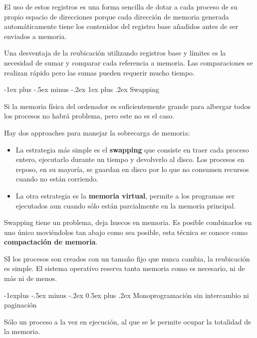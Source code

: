 \documentclass[10pt,portrait, twocolumn]{article}
\makeatletter
\renewcommand{\subsection}{\@startsection{subsection}{2}{0mm}%
                                {-1explus -.5ex minus -.2ex}%
                                {0.5ex plus .2ex}%
                                {\normalfont\normalsize\bfseries}}
\renewcommand{\subsubsection}{\@startsection{subsubsection}{3}{0mm}%
                                {-1ex plus -.5ex minus -.2ex}%
                                {1ex plus .2ex}%
                                {\normalfont\small\bfseries}}
\makeatother
\begin{document}
El uso de estos registros es una forma sencilla de dotar a cada proceso de su propio espacio de direcciones porque cada dirección de memoria generada automáticamente tiene los contenidos del registro base añadidos antes de ser enviados a memoria.

	\quad Una desventaja de la reubicación utilizando registros base y límites es la necesidad de sumar y comparar cada referencia a memoria. Las comparaciones se realizan rápido pero las sumas pueden requerir mucho tiempo.
	
\subsubsection{Swapping}

Si la memoria física del ordenador es suficientemente grande para albergar todos los procesos no habrá problema, pero este no es el caso. 

	\quad Hay dos approaches para manejar la sobrecarga de memoria:
	
	\begin{itemize}
		\item La estrategia más simple es el \textbf{swapping} que consiste en traer cada proceso entero, ejecutarlo durante un tiempo y devolverlo al disco. Los procesos en reposo, en su mayoría, se guardan en disco por lo que no consumen recursos cuando no están corriendo.
		\item La otra estrategia es la \textbf{memoria virtual}, permite a los programas ser ejecutados aun cuando sólo están parcialmente en la memoria principal.
	\end{itemize}	
	
Swapping tiene un problema, deja huecos en memoria. Es posible combinarlos en uno único moviéndolos tan abajo como sea posible, esta técnica se conoce como \textbf{compactación de memoria}.

	\quad SI los procesos son creados con un tamaño fijo que nunca cambia, la reubicación es simple. El sistema operativo reserva tanta memoria como es necesario, ni de más ni de menos.	
	
\subsection{Monoprogramación sin intercambio ni paginación}

Sólo un proceso a la vez en ejecución, al que se le permite ocupar la totalidad de la memoria.\\
\end{document}
